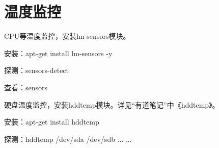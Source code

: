 \section{温度监控}
CPU等温度监控，安装lm-sensors模块。
\begin{itemize*}
  \item 安装：apt-get install lm-sensors -y
  \item 探测：sensors-detect
  \item 查看：sensors
\end{itemize*}

硬盘温度监控，安装hddtemp模块。详见“有道笔记”中《hddtemp》。
\begin{itemize*}
  \item 安装：apt-get install hddtemp
  \item 探测：hddtemp /dev/sda /dev/sdb ... ...
\end{itemize*}
